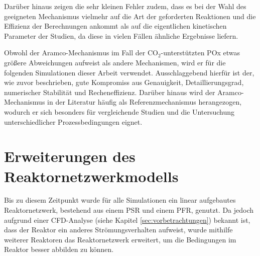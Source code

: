         Darüber hinaus zeigen die sehr kleinen Fehler zudem, dass es bei der Wahl des geeigneten Mechanismus vielmehr auf die Art der geforderten Reaktionen und die Effizienz der Berechnungen ankommt als auf die eigentlichen kinetischen Parameter der Studien, da diese in vielen Fällen ähnliche Ergebnisse liefern. 

        Obwohl der Aramco-Mechanismus im Fall der CO$_2$-unterstützten POx etwas größere Abweichungen aufweist als andere Mechanismen, wird er für die folgenden Simulationen dieser Arbeit verwendet. Ausschlaggebend hierfür ist der, wie zuvor beschrieben, gute Kompromiss aus Genauigkeit, Detaillierungsgrad, numerischer Stabilität und Recheneffizienz. Darüber hinaus wird der Aramco-Mechanismus in der Literatur häufig als Referenzmechanismus herangezogen, wodurch er sich besonders für vergleichende Studien und die Untersuchung unterschiedlicher Prozessbedingungen eignet.
\fi 
    \section{Erweiterungen des Reaktornetzwerkmodells}
        Bis zu diesem Zeitpunkt wurde für alle Simulationen ein linear aufgebautes Reaktornetzwerk, bestehend aus einem PSR und einem PFR, genutzt. Da jedoch aufgrund einer CFD-Analyse (siehe Kapitel \ref{sec:vorbetrachtungen}) bekannt ist, dass der Reaktor ein anderes Strömungsverhalten aufweist, wurde mithilfe weiterer Reaktoren das Reaktornetzwerk erweitert, um die Bedingungen im Reaktor besser abbilden zu können.

